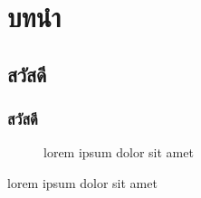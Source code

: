 \chapter{บทนำ}
\lipsum[1-3]

\section{สวัสดี}
\lipsum[1-3]

\subsection{สวัสดี}
\lipsum[1-1]

\begin{figure}[!htbp]
    \caption{lorem ipsum dolor sit amet}
\end{figure}

\begin{table}[!htbp]
    \caption{lorem ipsum dolor sit amet}
\end{table}
